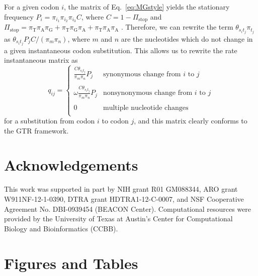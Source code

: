\documentclass[11pt]{article}
\begin{document}
For a given codon $i$, the matrix of Eq.\ \eqref{eq:MGstyle} yields the stationary frequency $P_i = \pi_{i_1}\pi_{i_2}\pi_{i_3}C$, where $C = 1 - \Pi_\text{stop}$ and $\Pi_\text{stop} = \pi_\text{T}\pi_\text{A}\pi_\text{G} + \pi_\text{T}\pi_\text{G}\pi_\text{A} + \pi_\text{T}\pi_\text{A}\pi_\text{A}$ \citep{MuseGaut1994}. Therefore, we can rewrite the term $\theta_{s_it_j}\pi_{t_j}$ as $\theta_{s_it_j}P_jC / (\pi_m\pi_n)$, where $m$ and $n$ are the nucleotides which do not change in a given instantaneous codon substitution. This allows us to rewrite the rate instantaneous matrix as 
\begin{equation}
q_{ij} = \left\{ 
\begin{array}{rl}
\frac{C\theta_{s_it_j}}{\pi_m\pi_n} P_j           &\text{synonymous change from $i$ to $j$} \\\\
\omega\frac{C\theta_{s_it_j}}{\pi_m\pi_n} P_j     &\text{nonsynonymous change from $i$ to $j$} \\\\
0                                              &\text{multiple nucleotide changes} \\           
\end{array} \right.
\end{equation} for a substitution from codon $i$ to codon $j$, and this matrix clearly conforms to the GTR framework.
		
\section*{Acknowledgements}
This work was supported in part by NIH grant R01 GM088344, ARO grant W911NF-12-1-0390, DTRA grant HDTRA1-12-C-0007, and NSF Cooperative Agreement No. DBI-0939454 (BEACON Center).  Computational resources were provided by the University of Texas at Austin's Center for Computational Biology and Bioinformatics (CCBB).

		
		


		
	
	
\section*{Figures and Tables}

\vspace{2cm}
	
\end{document}
